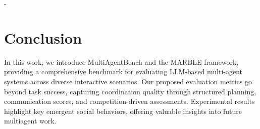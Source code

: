 -

\section{Conclusion}  
In this work, we introduce MultiAgentBench and the MARBLE framework, providing a comprehensive benchmark for evaluating LLM-based multi-agent systems across diverse interactive scenarios. Our proposed evaluation metrics go beyond task success, capturing coordination quality through structured planning, communication scores, and competition-driven assessments. Experimental results highlight key emergent social behaviors, offering valuable insights into future multiagent work. 